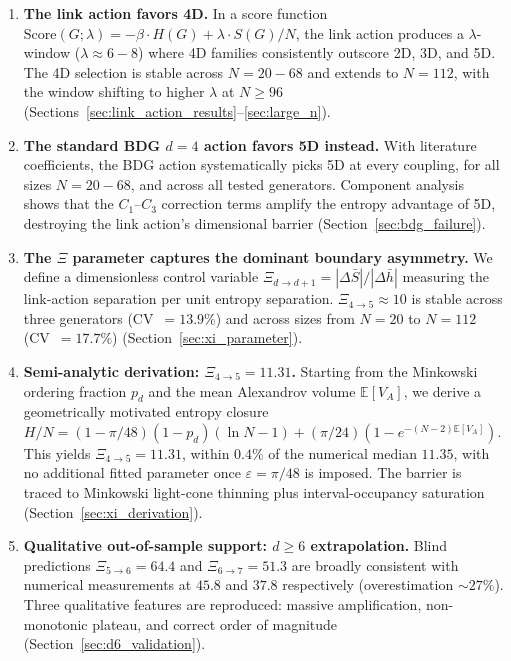 \documentclass[12pt,a4paper]{article}
\begin{document}
\begin{enumerate}[label=\textbf{R\arabic*}.]
\item \textbf{The link action favors 4D.}
  In a score function $\mathrm{Score}(G;\lambda) = -\beta \cdot H(G) + \lambda \cdot S(G)/N$,
  the link action produces a $\lambda$-window ($\lambda \approx 6{-}8$) where 4D families
  consistently outscore 2D, 3D, and 5D. The 4D selection is stable across $N = 20{-}68$
  and extends to $N = 112$, with the window shifting to higher $\lambda$ at $N \geq 96$
  (Sections~\ref{sec:link_action_results}--\ref{sec:large_n}).

\item \textbf{The standard BDG $d{=}4$ action favors 5D instead.}
  With literature coefficients, the BDG action systematically picks 5D at
  every coupling, for all sizes $N = 20{-}68$, and across all tested generators.
  Component analysis shows that the $C_1$--$C_3$ correction terms amplify
  the entropy advantage of 5D, destroying the link action's dimensional barrier
  (Section~\ref{sec:bdg_failure}).

\item \textbf{The $\Xi$ parameter captures the dominant boundary asymmetry.}
  We define a dimensionless control variable
  $\Xi_{d \to d+1} = |\Delta \bar S| / |\Delta \bar h|$
  measuring the link-action separation per unit entropy separation.
  $\Xi_{4\to5} \approx 10$ is stable across three generators (CV~$= 13.9\%$)
  and across sizes from $N = 20$ to $N = 112$ (CV~$= 17.7\%$)
  (Section~\ref{sec:xi_parameter}).

\item \textbf{Semi-analytic derivation: $\Xi_{4 \to 5} = 11.31$.}
  Starting from the Minkowski ordering fraction $p_d$ and the mean
  Alexandrov volume $\mathbb{E}[V_A]$, we derive a geometrically motivated
  entropy closure
  $H/N = (1-\pi/48)(1-p_d)(\ln N-1) + (\pi/24)\left(1-e^{-(N-2)\mathbb{E}[V_A]}\right)$.
  This yields $\Xi_{4\to5} = 11.31$, within $0.4\%$ of the numerical
  median $11.35$, with no additional fitted parameter once $\varepsilon = \pi/48$
  is imposed. The barrier is traced to Minkowski
  light-cone thinning plus interval-occupancy saturation
  (Section~\ref{sec:xi_derivation}).

\item \textbf{Qualitative out-of-sample support: $d \geq 6$ extrapolation.}
  Blind predictions $\Xi_{5\to6} = 64.4$ and $\Xi_{6\to7} = 51.3$
  are broadly consistent with numerical measurements at $45.8$ and $37.8$ respectively
  (overestimation $\sim 27\%$). Three qualitative features are reproduced:
  massive amplification, non-monotonic plateau, and correct order of magnitude
  (Section~\ref{sec:d6_validation}).
\end{enumerate}
\end{document}
